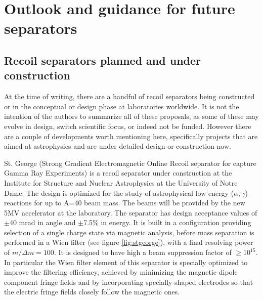 \section{Outlook and guidance for future separators}

\subsection{Recoil separators planned and under construction}

At the time of writing, there are a handful of recoil separators being constructed or in the conceptual or design phase at laboratories worldwide. It is not the intention of the authors to summarize all of these proposals, as some of these may evolve in design, switch scientific focus, or indeed not be funded. However there are a couple of developments worth mentioning here, specifically projects that are aimed at astrophysics and are under detailed design or construction now. 

St. George (Strong Gradient Electromagnetic Online Recoil separator for capture Gamma Ray Experiments) \cite{cou08} is a recoil separator under construction at the Institute for Structure and Nuclear Astrophysics at the University of Notre Dame. The design is optimized for the study of astrophysical low energy ($\alpha,\gamma$) reactions for up to A=40 beam mass. The beams will be provided by the new 5MV accelerator at the laboratory. The separator has design acceptance values of $\pm$40 mrad in angle and $\pm$7.5\% in energy. It is built in a configuration providing selection of a single charge state via magnetic analysis, before mass separation is performed in a Wien filter (see figure \ref{fig:stgeorge}), with a final resolving power of $m/\Delta m=100$. It is designed to have high a beam suppression factor of $\ge10^{15}$. In particular the Wien filter element of this separator is specially optimized to improve the filtering efficiency, achieved by minimizing the magnetic dipole component fringe fields and by incorporating specially-shaped electrodes so that the electric fringe fields closely follow the magnetic ones. 

